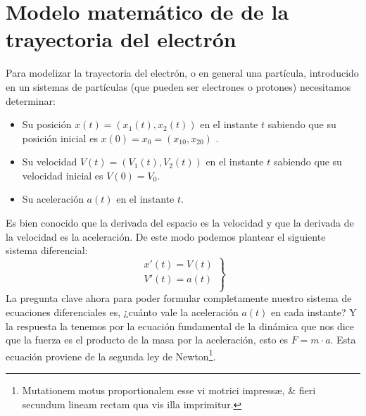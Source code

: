 
\section{Modelo matemático de de la trayectoria del electrón}
Para modelizar la trayectoria del electrón, o en general una partícula,  introducido en un sistemas de partículas (que pueden ser electrones o protones) necesitamos determinar:
\begin{itemize}
\item Su posición $x(t)=(x_1(t),x_2(t))$ en el instante $t$ sabiendo que su posición inicial es  $x(0)=x_0=(x_{10},x_{20})$ .
\item Su velocidad $V(t)=(V_1(t),V_2(t))$ en el instante $t$ sabiendo que su velocidad inicial es $V(0)=V_0$.
\item Su aceleración $a(t)$ en el instante $t$.
\end{itemize}
Es bien conocido que la derivada del espacio es la velocidad y que la derivada de la velocidad es la aceleración. De este modo podemos plantear el siguiente sistema diferencial:
\begin{equation}\label{eq:mov}
\left.\begin{array}{r}
x'(t)=V(t)\\
V'(t)=a(t)\\
\end{array}\right\}
\end{equation}
La pregunta clave ahora para poder formular completamente nuestro sistema de ecuaciones diferenciales es, ¿cuánto vale la aceleración $a(t)$ en cada instante? Y la respuesta la tenemos por la ecuación fundamental de la dinámica que nos dice que la fuerza es el producto de la masa por la aceleración, esto es $F=m\cdot a$. Esta ecuación proviene de la segunda ley de Newton\footnote{Mutationem motus proportionalem esse vi motrici impressæ, \& fieri secundum lineam rectam qua vis illa imprimitur.}.

